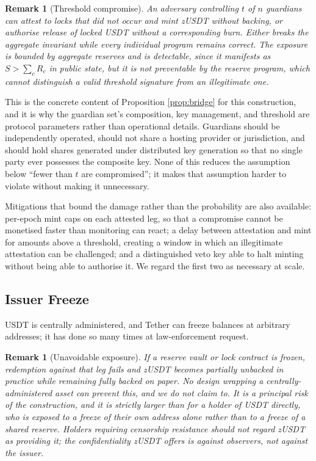 \documentclass[11pt,a4paper]{article}
\newtheorem{remark}[theorem]{Remark}
\begin{document}
\begin{remark}[Threshold compromise]
An adversary controlling $t$ of $n$ guardians can attest to locks that did not occur and mint zUSDT without backing, or authorise release of locked USDT without a corresponding burn. Either breaks the aggregate invariant while every individual program remains correct. The exposure is bounded by aggregate reserves and is detectable, since it manifests as $S > \sum_c R_c$ in public state, but it is not preventable by the reserve program, which cannot distinguish a valid threshold signature from an illegitimate one.
\end{remark}

This is the concrete content of Proposition \ref{prop:bridge} for this construction, and it is why the guardian set's composition, key management, and threshold are protocol parameters rather than operational details. Guardians should be independently operated, should not share a hosting provider or jurisdiction, and should hold shares generated under distributed key generation so that no single party ever possesses the composite key. None of this reduces the assumption below ``fewer than $t$ are compromised''; it makes that assumption harder to violate without making it unnecessary.

Mitigations that bound the damage rather than the probability are also available: per-epoch mint caps on each attested leg, so that a compromise cannot be monetised faster than monitoring can react; a delay between attestation and mint for amounts above a threshold, creating a window in which an illegitimate attestation can be challenged; and a distinguished veto key able to halt minting without being able to authorise it. We regard the first two as necessary at scale.

\subsection{Issuer Freeze}

USDT is centrally administered, and Tether can freeze balances at arbitrary addresses; it has done so many times at law-enforcement request.

\begin{remark}[Unavoidable exposure]
If a reserve vault or lock contract is frozen, redemption against that leg fails and zUSDT becomes partially unbacked in practice while remaining fully backed on paper. No design wrapping a centrally-administered asset can prevent this, and we do not claim to. It is a principal risk of the construction, and it is strictly larger than for a holder of USDT directly, who is exposed to a freeze of their own address alone rather than to a freeze of a shared reserve. Holders requiring censorship resistance should not regard zUSDT as providing it; the confidentiality zUSDT offers is against observers, not against the issuer.
\end{remark}
\end{document}
